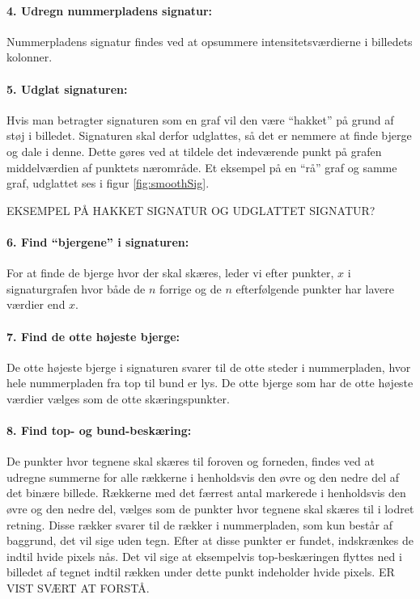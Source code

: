 \paragraph{4. Udregn nummerpladens signatur:} Nummerpladens signatur findes ved at opsummere intensitetsværdierne i billedets kolonner.

\paragraph{5. Udglat signaturen:} Hvis man betragter signaturen som en graf vil den være ``hakket'' på grund af støj i billedet. Signaturen skal derfor udglattes, så det er nemmere at finde bjerge og dale i denne. Dette gøres ved at tildele det indeværende punkt på grafen middelværdien af punktets nærområde. Et eksempel på en ``rå'' graf og samme graf, udglattet ses i figur \vref{fig:smoothSig}.

EKSEMPEL PÅ HAKKET SIGNATUR OG UDGLATTET SIGNATUR?


\paragraph{6. Find ``bjergene'' i signaturen:}
For at finde de bjerge hvor der skal skæres, leder vi efter punkter, $x$ i signaturgrafen hvor både de $n$ forrige og de $n$ efterfølgende punkter har lavere værdier end $x$.

\paragraph{7. Find de otte højeste bjerge:}
De otte højeste bjerge i signaturen svarer til de otte steder i nummerpladen, hvor hele nummerpladen fra top til bund er lys. De otte bjerge som har de otte højeste værdier vælges som de otte skæringspunkter.

\paragraph{8. Find top- og bund-beskæring:} De punkter hvor tegnene skal skæres til foroven og forneden, findes ved at udregne summerne for alle rækkerne i henholdsvis den øvre og den nedre del af det binære billede. Rækkerne med det færrest antal markerede i henholdsvis den øvre og den nedre del, vælges som de punkter hvor tegnene skal skæres til i lodret retning. Disse rækker svarer til de rækker i nummerpladen, som kun består af baggrund, det vil sige uden tegn. Efter at disse punkter er fundet, indskrænkes de indtil hvide pixels nås. Det vil sige at eksempelvis top-beskæringen flyttes ned i billedet af tegnet indtil rækken under dette punkt indeholder hvide pixels. ER VIST SVÆRT AT FORSTÅ.

